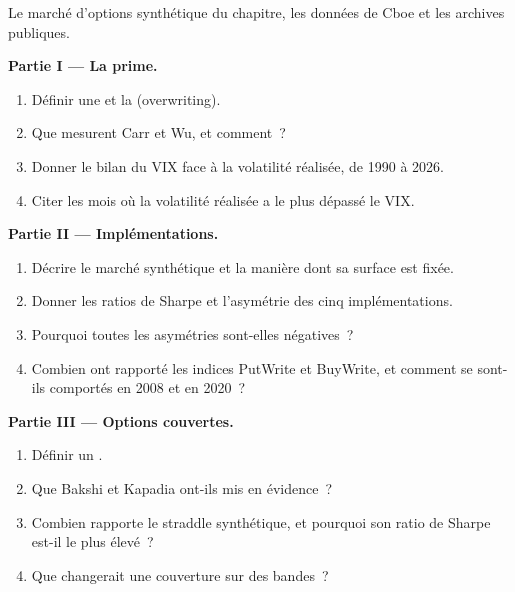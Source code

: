 \begin{problem}\label{pb:s2:harvesting-the-variance-risk-premium:1}
Le marché d'options synthétique du chapitre, les données de Cboe et les archives publiques.

\medskip\noindent\textbf{Partie I --- La prime.}
\begin{enumerate}
\item Définir une  et la  (overwriting).
\item Que mesurent Carr et Wu, et comment~?
\item Donner le bilan du VIX face à la volatilité réalisée, de 1990 à 2026.
\item Citer les mois où la volatilité réalisée a le plus dépassé le VIX.
\end{enumerate}

\medskip\noindent\textbf{Partie II --- Implémentations.}
\begin{enumerate}[resume]
\item Décrire le marché synthétique et la manière dont sa surface est fixée.
\item Donner les ratios de Sharpe et l'asymétrie des cinq implémentations.
\item Pourquoi toutes les asymétries sont-elles négatives~?
\item Combien ont rapporté les indices PutWrite et BuyWrite, et comment se sont-ils comportés en 2008 et en 2020~?
\end{enumerate}

\medskip\noindent\textbf{Partie III --- Options couvertes.}
\begin{enumerate}[resume]
\item Définir un .
\item Que Bakshi et Kapadia ont-ils mis en évidence~?
\item Combien rapporte le straddle synthétique, et pourquoi son ratio de Sharpe est-il le plus élevé~?
\item Que changerait une couverture sur des bandes~?
\end{enumerate}


\end{problem}
